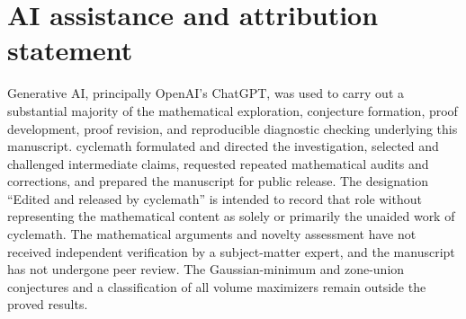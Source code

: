 \documentclass[10pt,reqno]{amsart}
\theoremstyle{definition}
\theoremstyle{remark}
\begin{document}
\section*{AI assistance and attribution statement}
Generative AI, principally OpenAI's ChatGPT, was used to carry out a substantial majority of the mathematical exploration, conjecture formation, proof development, proof revision, and reproducible diagnostic checking underlying this manuscript. cyclemath formulated and directed the investigation, selected and challenged intermediate claims, requested repeated mathematical audits and corrections, and prepared the manuscript for public release. The designation ``Edited and released by cyclemath'' is intended to record that role without representing the mathematical content as solely or primarily the unaided work of cyclemath. The mathematical arguments and novelty assessment have not received independent verification by a subject-matter expert, and the manuscript has not undergone peer review. The Gaussian-minimum and zone-union conjectures and a classification of all volume maximizers remain outside the proved results.
\end{document}
